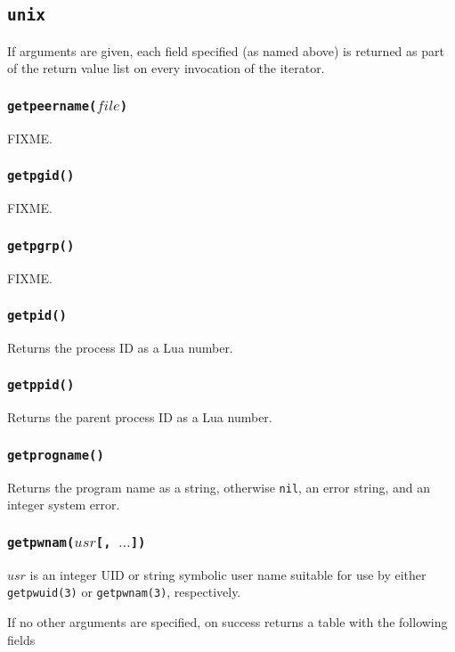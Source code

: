 \documentclass[11pt, oneside]{memoir}
\newcommand*{\nil}[0]{\texttt{nil}\xspace}
\newcommand*{\syscall}[1]{\texttt{#1}\xspace}
\newcommand*{\fn}[1]{\texttt{#1}\xspace}
\newcounter{toccols}
\newenvironment{Module}[1]{
	\subsection{\texttt{#1}}
	\addtocontents{toc}{
		\protect\begin{multicols}{\value{toccols}}
	}
}{
	\addtocontents{toc}{\protect\end{multicols}}
}
\begin{document}
\begin{Module}{unix}
If arguments are given, each field specified (as named above) is returned as part of the return value list on every invocation of the iterator.

\subsubsection[\fn{getpeername}]{\fn{getpeername($file$)}}

FIXME.

\subsubsection[\fn{getpgid}]{\fn{getpgid()}}

FIXME.

\subsubsection[\fn{getpgrp}]{\fn{getpgrp()}}

FIXME.

\subsubsection[\fn{getpid}]{\fn{getpid()}}

Returns the process ID as a Lua number.

\subsubsection[\fn{getppid}]{\fn{getppid()}}

Returns the parent process ID as a Lua number.

\subsubsection[\fn{getprogname}]{\fn{getprogname()}}

Returns the program name as a string, otherwise \nil, an error string, and an integer system error.

\subsubsection[\fn{getpwnam}]{\fn{getpwnam($usr$[, $\ldots$])}}

$usr$ is an integer UID or string symbolic user name suitable for use by either \syscall{getpwuid(3)} or \syscall{getpwnam(3)}, respectively.

If no other arguments are specified, on success returns a table with the following fields


\end{Module}
\end{document}
